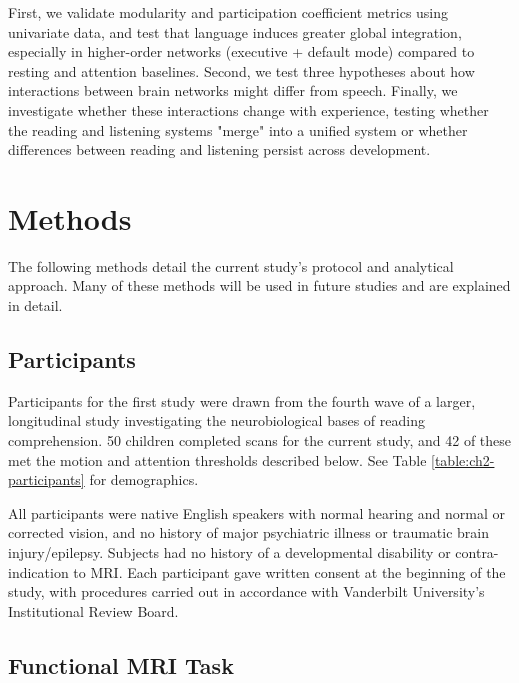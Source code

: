 First, we validate modularity and participation coefficient metrics using univariate data, and test that language induces greater global integration, especially in higher-order networks (executive + default mode) compared to resting and attention baselines. Second, we test three hypotheses about how interactions between brain networks might differ from speech. Finally, we investigate whether these interactions change with experience, testing whether the reading and listening systems "merge" into a unified system or whether differences between reading and listening persist across development.


\section{Methods}

The following methods detail the current study's protocol and analytical approach. Many of these methods will be used in future studies and are explained in detail. 

\subsection{Participants}

Participants for the first study were drawn from the fourth wave of a larger, longitudinal study investigating the neurobiological bases of reading comprehension. 50 children completed scans for the current study, and 42 of these met the motion and attention thresholds described below. See Table \ref{table:ch2-participants} for demographics. 

All participants were native English speakers with normal hearing and normal or corrected vision, and no history of major psychiatric illness or traumatic brain injury/epilepsy. Subjects had no history of a developmental disability or contra-indication to MRI.  Each participant gave written consent at the beginning of the study, with procedures carried out in accordance with Vanderbilt University’s Institutional Review Board.

\begin{table}
	\scriptsize
	\renewcommand{\tabcolsep}{0.09cm}
	\centering
	
	\caption[Participant demographics for Study 1.]
	\label{table:ch2-participants}
\end{table}


\subsection{Functional MRI Task}


